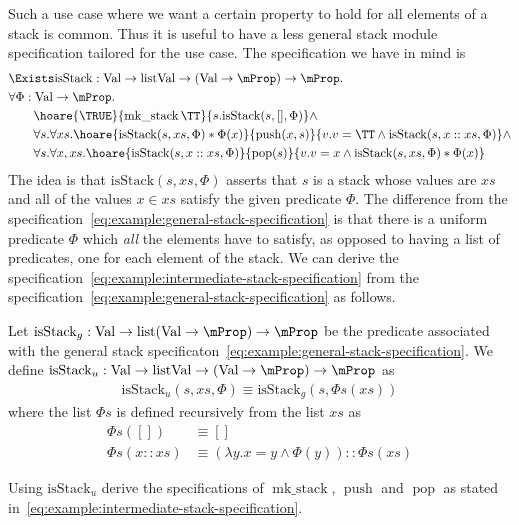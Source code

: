 Such a use case where we want a certain property to hold for all elements of a stack is common.
Thus it is useful to have a less general stack module specification tailored for the use case.
The specification we have in mind is
\begin{align}
  \label{eq:example:intermediate-stack-specification}
  \begin{split}
    &\Exists \mathrm{isStack} : \Val \to \mathrm{list} \Val \to (\Val\to\Prop) \to \Prop.\\
    & \forall \Phi : \Val \to \Prop. \\
    &\qquad \hoare{\TRUE}{\operatorname{mk\_stack} \TT}{s. \mathrm{isStack}(s,[],\Phi)} \land \\
    &\qquad \forall s. \forall xs. \hoare{\mathrm{isStack}(s,xs,\Phi) * \Phi(x)}{\operatorname{push} (x,s)}{v. v = \TT \land \mathrm{isStack}(s,x::xs,\Phi)} \land\\
    &\qquad \forall s. \forall x, xs. \hoare{\mathrm{isStack}(s,x::xs,\Phi)}{\operatorname{pop} (s)}{v. v =
      x\land \mathrm{isStack}(s,xs,\Phi) * \Phi(x)}
  \end{split}
\end{align}
The idea is that $\mathrm{isStack}(s, xs, \Phi)$ asserts that $s$ is a stack whose values are $xs$ and all of the values $x \in xs$ satisfy the given predicate $\Phi$.
The difference from the specification~\eqref{eq:example:general-stack-specification} is that there is a uniform predicate $\Phi$ which \emph{all} the elements have to satisfy, as opposed to having a list of predicates, one for each element of the stack.
We can derive the specification~\eqref{eq:example:intermediate-stack-specification} from the specification~\eqref{eq:example:general-stack-specification} as follows.

Let $\mathrm{isStack}_g : \Val \to \operatorname{list} (\Val \to \Prop) \to \Prop$ be the predicate associated with the general stack specificaton~\eqref{eq:example:general-stack-specification}.
We define $\mathrm{isStack}_u : \Val \to \mathrm{list} \Val \to (\Val\to\Prop) \to \Prop$ as
\begin{align*}
  \mathrm{isStack}_u(s, xs, \Phi) \equiv \mathrm{isStack}_g(s, \Phi{s}(xs))
\end{align*}
where the list $\Phi{s}$ is defined recursively from the list $xs$ as
\begin{align*}
  \Phi{s}([]) &\equiv []\\
  \Phi{s}(x::xs) &\equiv (\lambda y. x = y \land \Phi(y))::\Phi{s}(xs)
\end{align*}
\begin{exercise}
  Using $\mathrm{isStack}_u$ derive the specifications of $\operatorname{mk\_stack}$, $\operatorname{push}$ and $\operatorname{pop}$ as stated in~\eqref{eq:example:intermediate-stack-specification}.
\end{exercise}


